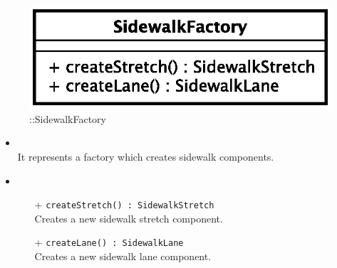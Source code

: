 \begin{figure}[h]
\centering
\includegraphics[scale=0.6,keepaspectratio]{images/solution/sidewalk_factory.eps}
\caption{\pReactiveFactory::SidewalkFactory}
\label{fig:sd-app-sidewalk-factory}
\end{figure}
\FloatBarrier
\begin{itemize}
  \item \textbf{\descr} \\
It represents a factory which creates sidewalk components.
  \item \textbf{\ops} \\
  \begin{itemize} 
    \item[+] \texttt{createStretch() : SidewalkStretch} \\
Creates a new sidewalk stretch component.
    \item[+] \texttt{createLane() : SidewalkLane} \\
Creates a new sidewalk lane component.
  \end{itemize}
\end{itemize}
